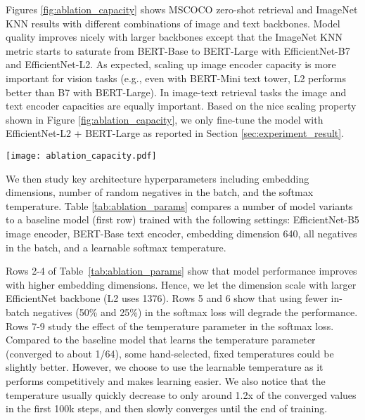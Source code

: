 \documentclass{article}
\begin{document}
Figures \ref{fig:ablation_capacity} shows MSCOCO zero-shot retrieval and ImageNet KNN results with different combinations of image and text backbones. Model quality improves nicely with larger backbones except that the ImageNet KNN metric starts to saturate from BERT-Base to BERT-Large with EfficientNet-B7 and EfficientNet-L2. As expected, scaling up image encoder capacity is more important for vision tasks (e.g., even with BERT-Mini text tower, L2 performs better than B7 with BERT-Large). In image-text retrieval tasks the image and text encoder capacities are equally important. Based on the nice scaling property shown in Figure \ref{fig:ablation_capacity}, we only fine-tune the model with EfficientNet-L2 + BERT-Large as reported in Section \ref{sec:experiment_result}. 




\begin{figure*}[t]
\begin{center}
    \centerline{\texttt{[image: ablation\_capacity.pdf]}}
    \vskip -0.15in
    \caption{Zero-shot image-text retrieval and ImageNet KNN accuracy@1 with different image and text encoder sizes.}
    \label{fig:ablation_capacity}
    \vskip -0.3in
\end{center}
\end{figure*}



We then study key architecture hyperparameters including embedding dimensions,
number of random negatives in the batch, and the softmax temperature. Table \ref{tab:ablation_params} compares a number of model variants to a baseline model (first row) trained with the following settings: EfficientNet-B5 image encoder, BERT-Base text encoder, embedding dimension 640, all negatives in the batch, and a learnable softmax temperature.

Rows 2-4 of Table~\ref{tab:ablation_params} show that model performance improves with higher embedding dimensions. Hence, we let the dimension scale with larger EfficientNet backbone (L2 uses 1376).
Rows 5 and 6 show that using fewer in-batch negatives (50\% and 25\%) in the softmax loss will degrade the performance.
Rows 7-9 study the effect of the temperature parameter in the softmax loss. Compared to the baseline model that learns the temperature parameter (converged to about 1/64), some hand-selected, fixed temperatures could be slightly better. However, we choose to use the learnable temperature as it performs competitively and makes learning easier. We also notice that the temperature usually quickly decrease to only around 1.2x of the converged values in the first 100k steps, and then slowly converges until the end of training.
\end{document}
